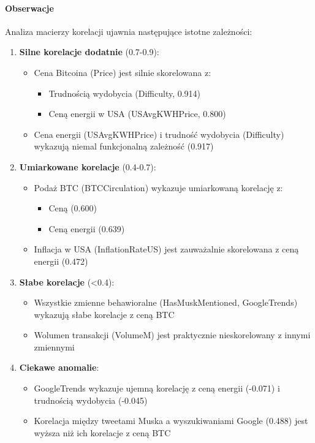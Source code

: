 \documentclass[
  11pt,
]{article}
\providecommand{\tightlist}{%
  \setlength{\itemsep}{0pt}\setlength{\parskip}{0pt}}
\begin{document}
\paragraph{Obserwacje}\label{obserwacje-9}

Analiza macierzy korelacji ujawnia następujące istotne zależności:

\begin{enumerate}
\def\labelenumi{\arabic{enumi}.}
\tightlist
\item
  \textbf{Silne korelacje dodatnie} (0.7-0.9):

  \begin{itemize}
  \tightlist
  \item
    Cena Bitcoina (Price) jest silnie skorelowana z:

    \begin{itemize}
    \tightlist
    \item
      Trudnością wydobycia (Difficulty, 0.914)
    \item
      Ceną energii w USA (USAvgKWHPrice, 0.800)
    \end{itemize}
  \item
    Cena energii (USAvgKWHPrice) i trudność wydobycia (Difficulty)
    wykazują niemal funkcjonalną zależność (0.917)
  \end{itemize}
\item
  \textbf{Umiarkowane korelacje} (0.4-0.7):

  \begin{itemize}
  \tightlist
  \item
    Podaż BTC (BTCCirculation) wykazuje umiarkowaną korelację z:

    \begin{itemize}
    \tightlist
    \item
      Ceną (0.600)
    \item
      Ceną energii (0.639)
    \end{itemize}
  \item
    Inflacja w USA (InflationRateUS) jest zauważalnie skorelowana z ceną
    energii (0.472)
  \end{itemize}
\item
  \textbf{Słabe korelacje} (\textless0.4):

  \begin{itemize}
  \tightlist
  \item
    Wszystkie zmienne behawioralne (HasMuskMentioned, GoogleTrends)
    wykazują słabe korelacje z ceną BTC
  \item
    Wolumen transakcji (VolumeM) jest praktycznie nieskorelowany z
    innymi zmiennymi
  \end{itemize}
\item
  \textbf{Ciekawe anomalie}:

  \begin{itemize}
  \tightlist
  \item
    GoogleTrends wykazuje ujemną korelację z ceną energii (-0.071) i
    trudnością wydobycia (-0.045)
  \item
    Korelacja między tweetami Muska a wyszukiwaniami Google (0.488) jest
    wyższa niż ich korelacje z ceną BTC
  \end{itemize}
\end{enumerate}
\end{document}
